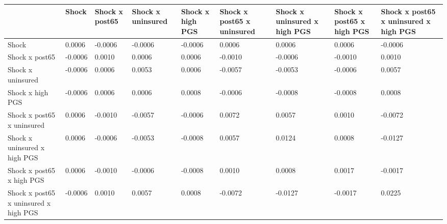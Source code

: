 % 
\begin{tabular}{p{5cm}p{2cm}p{2cm}p{2cm}p{2cm}p{2cm}p{2cm}p{2cm}p{2cm}}
  \hline
 & Shock & Shock x post65 & Shock x uninsured & Shock x high PGS & Shock x post65 x uninsured & Shock x uninsured x high PGS &  Shock x post65 x high PGS & Shock x post65 x uninsured x high PGS \\ 
  \hline
Shock & 0.0006 & -0.0006 & -0.0006 & -0.0006 & 0.0006 & 0.0006 & 0.0006 & -0.0006 \\ 
  Shock x post65 & -0.0006 & 0.0010 & 0.0006 & 0.0006 & -0.0010 & -0.0006 & -0.0010 & 0.0010 \\ 
  Shock x uninsured & -0.0006 & 0.0006 & 0.0053 & 0.0006 & -0.0057 & -0.0053 & -0.0006 & 0.0057 \\ 
  Shock x high PGS & -0.0006 & 0.0006 & 0.0006 & 0.0008 & -0.0006 & -0.0008 & -0.0008 & 0.0008 \\ 
  Shock x post65 x uninsured & 0.0006 & -0.0010 & -0.0057 & -0.0006 & 0.0072 & 0.0057 & 0.0010 & -0.0072 \\ 
  Shock x uninsured x high PGS & 0.0006 & -0.0006 & -0.0053 & -0.0008 & 0.0057 & 0.0124 & 0.0008 & -0.0127 \\ 
   Shock x post65 x high PGS & 0.0006 & -0.0010 & -0.0006 & -0.0008 & 0.0010 & 0.0008 & 0.0017 & -0.0017 \\ 
  Shock x post65 x uninsured x high PGS & -0.0006 & 0.0010 & 0.0057 & 0.0008 & -0.0072 & -0.0127 & -0.0017 & 0.0225 \\ 
   \hline
\end{tabular}
